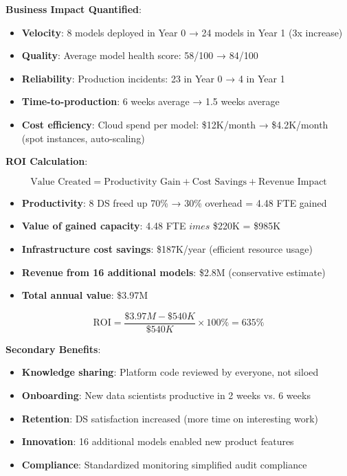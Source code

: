 \textbf{Business Impact Quantified}:

\begin{itemize}
    \item \textbf{Velocity}: 8 models deployed in Year 0 → 24 models in Year 1 (3x increase)
    \item \textbf{Quality}: Average model health score: 58/100 → 84/100
    \item \textbf{Reliability}: Production incidents: 23 in Year 0 → 4 in Year 1
    \item \textbf{Time-to-production}: 6 weeks average → 1.5 weeks average
    \item \textbf{Cost efficiency}: Cloud spend per model: \$12K/month → \$4.2K/month (spot instances, auto-scaling)
\end{itemize}

\textbf{ROI Calculation}:

\begin{equation}
\text{Value Created} = \text{Productivity Gain} + \text{Cost Savings} + \text{Revenue Impact}
\end{equation}

\begin{itemize}
    \item \textbf{Productivity}: 8 DS freed up 70\% → 30\% overhead = 4.48 FTE gained
    \item \textbf{Value of gained capacity}: 4.48 FTE $	imes$ \$220K = \$985K
    \item \textbf{Infrastructure cost savings}: \$187K/year (efficient resource usage)
    \item \textbf{Revenue from 16 additional models}: \$2.8M (conservative estimate)
    \item \textbf{Total annual value}: \$3.97M
\end{itemize}

\begin{equation}
\text{ROI} = \frac{\$3.97M - \$540K}{\$540K} \times 100\% = 635\%
\end{equation}

\textbf{Secondary Benefits}:
\begin{itemize}
    \item \textbf{Knowledge sharing}: Platform code reviewed by everyone, not siloed
    \item \textbf{Onboarding}: New data scientists productive in 2 weeks vs. 6 weeks
    \item \textbf{Retention}: DS satisfaction increased (more time on interesting work)
    \item \textbf{Innovation}: 16 additional models enabled new product features
    \item \textbf{Compliance}: Standardized monitoring simplified audit compliance
\end{itemize}

